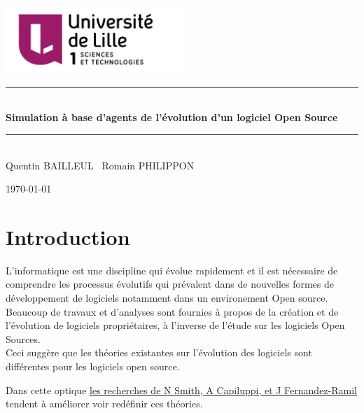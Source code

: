 \documentclass{article}
\newcommand{\HRule}{\rule{\linewidth}{0.5mm}}
\begin{document}
\begin{titlepage}
\begin{center}

\includegraphics[width=0.5\textwidth]{pictures/ul.png}~\\[1cm]

\HRule \\[0.2cm]
{ \huge \bfseries Simulation à base d'agents de l'évolution d'un
  logiciel Open Source \\[0.4cm] }

\HRule \\[1.5cm]
Quentin BAILLEUL \  Romain PHILIPPON

\vfill

{\large \today}

\end{center}
\end{titlepage}

\newpage
\tableofcontents

\newpage

\section{Introduction}
L'informatique est une discipline qui évolue rapidement et
il est nécessaire de comprendre
les processus évolutifs qui prévalent dans de nouvelles formes de
développement de logiciels notamment dans un environement Open source.
\\

Beaucoup de travaux et d'analyses sont fournies à propos de la
création et de l'évolution de logiciels propriétaires, à l'inverse de
l'étude sur les logiciels Open Sources. 
\\

Ceci suggère que les théories existantes sur l'évolution des logiciels
sont différentes pour les logiciels open source.

Dans cette optique \href{http://oro.open.ac.uk/4698/1/}{les recherches de N Smith, A Capiluppi, et
J Fernandez-Ramil} tendent à améliorer voir redéfinir ces théories.
\\
\end{document}
